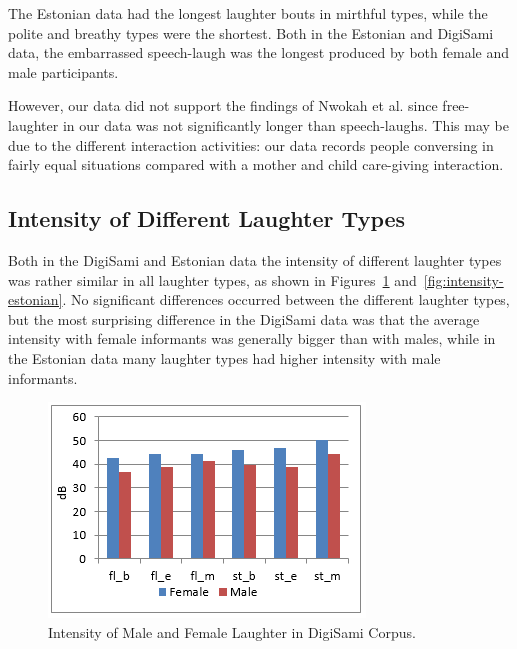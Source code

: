 \documentclass[10pt,journal,compsoc]{IEEEtran}
\begin{document}
The Estonian data had the longest laughter bouts in mirthful types, while the polite and breathy types were the shortest. Both in the Estonian and DigiSami data, the embarrassed speech-laugh was the longest produced by both female and male participants.

However, our data did not support the findings of Nwokah et al. \cite{Nwokah:ea:99} since free-laughter in our data was not significantly longer than speech-laughs. This may be due to the different interaction activities: our data records people conversing in fairly equal situations compared with a mother and child care-giving interaction.

\subsection{Intensity of Different Laughter Types}

Both in the DigiSami and Estonian data the intensity of different laughter types was rather similar in all laughter types, as shown in Figures~\ref{fig:intensity-digisami} and~\ref{fig:intensity-estonian}. No significant differences occurred between the different laughter types, but the most surprising difference in the DigiSami data was that the average intensity with female informants was generally bigger than with males, while in the Estonian data many laughter types had higher intensity with male informants.

\begin{figure}[!t]
\centering
\includegraphics[width=1\linewidth]{images/Intensity-DigiSami.png}
\caption{Intensity of Male and Female Laughter in DigiSami Corpus.}
\label{fig:intensity-digisami}
\end{figure}
\end{document}
